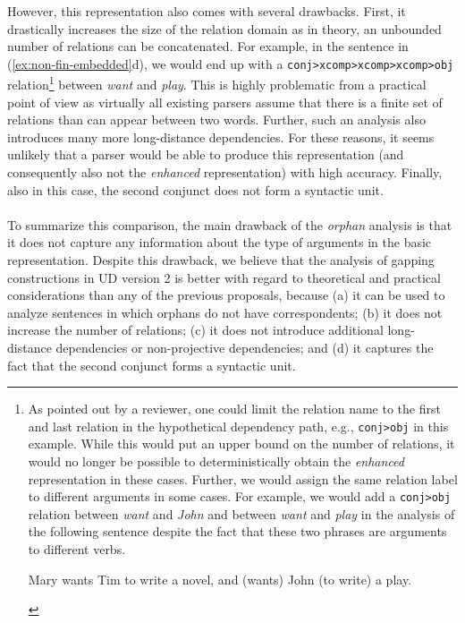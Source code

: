 \documentclass[11pt]{article}
\newcounter{excounter}
\begin{document}
However, this representation also comes with several drawbacks. First, it drastically increases the size of the relation domain as in theory, an unbounded number of relations can be concatenated. For example, in the sentence in  (\ref{ex:non-fin-embedded}d), we would end up with a \texttt{conj>xcomp>xcomp>xcomp>obj} relation\footnote{As pointed out by a reviewer, one could limit the relation name to the first and last relation in the hypothetical dependency path, e.g., \texttt{conj>obj} in this example. While this would put an upper bound on the number of relations, it would no longer be possible to deterministically obtain the \textit{enhanced} representation in these cases. Further, we would assign the same relation label to different arguments in some cases. For example, we would add a \texttt{conj>obj} relation between \textit{want} and \textit{John} and between \textit{want} and \textit{play} in the analysis of the following sentence despite the fact that these two phrases are arguments to different verbs.
\begin{exe}
\footnotesize
  \setcounter{xnumi}{\value{excounter}}
  \ex Mary wants Tim to write a novel, and (wants) John (to write) a play.
  \end{exe}
} between \textit{want} and \textit{play}. This is highly problematic from a practical point of view as virtually all existing parsers assume that there is a finite set of relations than can appear between two words. Further, such an analysis also introduces many more long-distance dependencies. For these reasons, it seems unlikely that a parser would be able to produce this representation (and consequently also not the \textit{enhanced} representation) with high accuracy. Finally, also in this case, the second conjunct does not form a syntactic unit.

\noindent\paragraph{} To summarize this comparison, the main drawback of the \textit{orphan} analysis is that it does not capture any information about the type of arguments in the basic representation. Despite this drawback, we believe that the analysis of gapping constructions in UD version 2 is better with regard to theoretical and practical considerations than any of the previous proposals, because (a) it can be used to analyze sentences in which orphans do not have correspondents; (b) it does not increase the number of relations; (c) it does not introduce additional long-distance dependencies or non-projective dependencies; and (d) it captures the fact that the second conjunct forms a syntactic unit.
\end{document}
